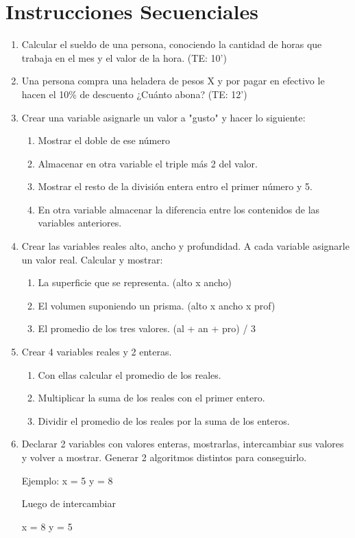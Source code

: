 \chapter{Instrucciones Secuenciales}

\begin{enumerate}[resume]

	\item Calcular el sueldo de una persona, conociendo la cantidad de horas que trabaja en el mes y el valor de la hora. (TE: 10')

	\item Una persona compra una heladera de pesos X y por pagar en efectivo le hacen el 10\% de descuento ¿Cuánto abona? (TE: 12')


  \item Crear una variable asignarle un valor a "gusto"  y hacer lo siguiente:
    \begin{enumerate}
      \item Mostrar el doble de ese n\'umero
      \item Almacenar en otra variable el triple más 2 del valor.
      \item Mostrar el resto de la división entera entro el primer número y 5.
      \item En otra variable almacenar la diferencia entre los contenidos de las variables anteriores.
    \end{enumerate}

  \item Crear las variables reales alto, ancho y profundidad. A cada variable asignarle un valor real. Calcular y mostrar:
    \begin{enumerate}
      \item La superficie que se representa. (alto x ancho)
      \item El volumen suponiendo un prisma. (alto x ancho x prof)
      \item El promedio de los tres valores. (al + an + pro) / 3
    \end{enumerate}

  \item Crear 4 variables reales y 2 enteras.
    \begin{enumerate}
      \item Con ellas calcular el promedio de los reales.
      \item Multiplicar la suma de los reales con el primer entero.
      \item Dividir el promedio de los reales por la suma de los enteros.
    \end{enumerate}

  \item Declarar 2 variables con valores enteras, mostrarlas, intercambiar sus valores
y volver a mostrar. Generar 2 algoritmos distintos para conseguirlo.

Ejemplo:         x = 5    y = 8

Luego de intercambiar

x = 8    y = 5
                         



\end{enumerate}
